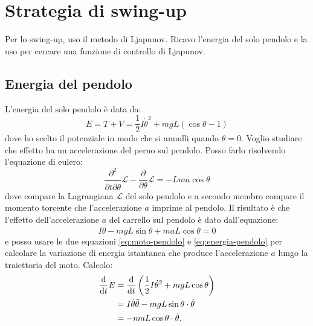 \section{Strategia di swing-up}
Per lo swing-up, uso il metodo di Ljapunov.
Ricavo l'energia del solo pendolo e la uso per cercare una funzione
di controllo di Ljapunov.

\subsection{Energia del pendolo}
\label{subsec:energia-pendolo}
L'energia del solo pendolo è data da:
\begin{equation}
    E = T + V = \frac 1 2 I \dot \theta^2 + mgL(\cos\theta-1)
    \label{eq:energia-pendolo}
\end{equation}
dove ho scelto il potenziale in modo che si annulli quando $\theta=0$. Voglio studiare che effetto ha un accelerazione del perno sul pendolo. Posso farlo risolvendo l'equazione di eulero:
\begin{equation*}
    \frac {\partial^2} {\partial t \partial \dot \theta} \mathcal L - \frac \partial {\partial \theta} \mathcal L = -L ma \cos \theta
\end{equation*}
dove compare la Lagrangiana $\mathcal L$ del solo pendolo e a secondo membro compare il momento torcente che l'accelerazione $a$ imprime al pendolo. Il risultato è che l'effetto dell'accelerazione $a$ del carrello sul pendolo è dato dall'equazione:
\begin{equation}
    I \ddot \theta - mgL\sin \theta + maL \cos \theta = 0
    \label{eq:moto-pendolo}
\end{equation}
e posso usare le due equazioni \eqref{eq:moto-pendolo} e \eqref{eq:energia-pendolo} per calcolare la variazione di energia istantanea che produce l'accelerazione $a$ lungo la traiettoria del moto. Calcolo:
\begin{equation}
    \begin{aligned}
        \frac {\text d} {\text d t} E
        &= \frac {\text d} {\text d t} \left(\frac 1 2 I \dot \theta ^2 + mgL \cos \theta  \right) \\
        &= I \dot \theta \ddot \theta - mgL \sin \theta \cdot \dot \theta \\
        &= -maL \cos \theta \cdot \dot \theta
        .
        \label{eq:effetto-energia}
    \end{aligned}
\end{equation}
